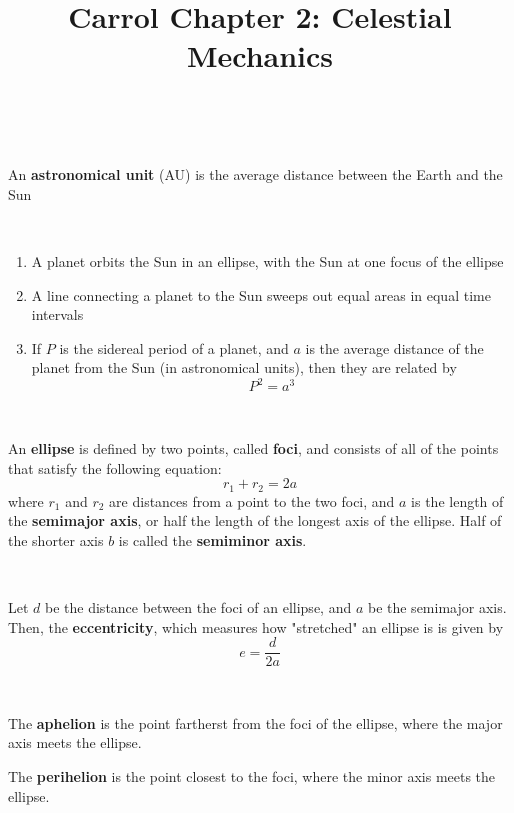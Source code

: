 \documentclass{article}
\title{Carrol Chapter 2: Celestial Mechanics}
\begin{document}
\maketitle

\begin{definition}
\

An \textbf{astronomical unit} (AU) is the average distance between the Earth and the Sun 
\end{definition}

\begin{proposition}
\

\begin{enumerate}
    \item A planet orbits the Sun in an ellipse, with the Sun at one focus of the ellipse
    \item A line connecting a planet to the Sun sweeps out equal areas in equal time intervals
    \item If $P$ is the sidereal period of a planet, and $a$ is the average distance of the planet from the Sun (in astronomical units), then they are related by $$P^2 = a^3$$
\end{enumerate}
\end{proposition}

\begin{definition}[Ellipses]
\

An \textbf{ellipse} is defined by two points, called \textbf{foci}, and consists of all of the points that satisfy the following equation:  $$r_1 + r_2 = 2a$$where $r_1$ and $r_2$ are distances from a point to the two foci, and $a$ is the length of the \textbf{semimajor axis}, or half the length of the longest axis of the ellipse. Half of the shorter axis $b$ is called the \textbf{semiminor axis}. 
\end{definition}

\begin{definition}[Eccentricity]
\

Let $d$ be the distance between the foci of an ellipse, and $a$ be the semimajor axis. Then, the \textbf{eccentricity}, which measures how "stretched" an ellipse is is given by $$e = \frac{d}{2a}$$  
\end{definition}

\begin{definition}
\

The \textbf{aphelion} is the point fartherst from the foci of the ellipse, where the major axis meets the ellipse.

The \textbf{perihelion} is the point closest to the foci, where the minor axis meets the ellipse. 
\end{definition}
\end{document}
